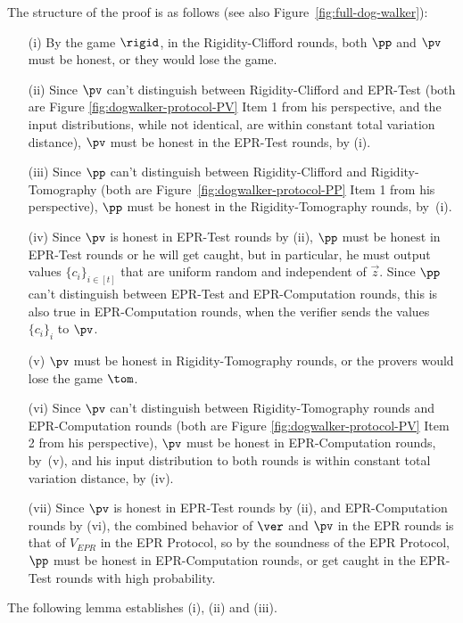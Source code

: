 \noindent The structure of the proof is as follows (see also Figure~\ref{fig:full-dog-walker}):
\begin{enumerate}
\item[(i)] By the game $\rigid$, in the Rigidity-Clifford rounds, both $\pp$ and $\pv$ must be honest, or they would lose the game.
\item[(ii)] Since $\pv$ can't distinguish between Rigidity-Clifford and EPR-Test (both are Figure \ref{fig:dogwalker-protocol-PV} Item 1 from his perspective, and the input distributions, while not identical, are within constant total variation distance), $\pv$ must be honest in the EPR-Test rounds, by (i). 
\item[(iii)] Since $\pp$ can't distinguish between Rigidity-Clifford and Rigidity-Tomography (both are Figure~\ref{fig:dogwalker-protocol-PP} Item 1 from his perspective), $\pp$ must be honest in the Rigidity-Tomography rounds, by~(i). 
\item[(iv)] Since $\pv$ is honest in EPR-Test rounds by (ii), $\pp$ must be honest in EPR-Test rounds or he will get caught, but in particular, he must output values $\{c_i\}_{i\in [t]}$ that are uniform random and independent of $\vec{z}$. Since $\pp$ can't distinguish between EPR-Test and EPR-Computation rounds, this is also true in EPR-Computation rounds, when the verifier sends the values $\{c_i\}_i$ to $\pv$. 
\item[(v)] $\pv$ must be honest in Rigidity-Tomography rounds, or the provers would lose the game $\tom$.
\item[(vi)] Since $\pv$ can't distinguish between Rigidity-Tomography rounds and EPR-Computation rounds (both are Figure \ref{fig:dogwalker-protocol-PV} Item 2 from his perspective), $\pv$ must be honest in EPR-Computation rounds, by~(v), and his input distribution to both rounds is within constant total variation distance, by (iv).
\item[(vii)] Since $\pv$ is honest in EPR-Test rounds by (ii), and EPR-Computation rounds by (vi), the combined behavior of $\ver$ and $\pv$ in the EPR rounds is that of $V_{EPR}$ in the EPR Protocol, so
by the soundness of the EPR Protocol, $\pp$ must be honest in EPR-Computation rounds, or get caught in the EPR-Test rounds with high probability.
\end{enumerate}

 The following lemma establishes (i), (ii) and (iii). 

